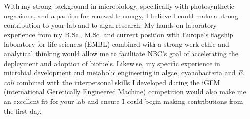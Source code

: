 \documentclass[11pt,a4paper,sans]{moderncv}
\begin{document}
\begin{spacing}{1.15}
With my strong background in microbiology, specifically with photosynthetic organisms, and a passion for renewable energy, I believe I could make a strong contribution to your lab and to algal research. 
My hands-on laboratory experience from my B.Sc., M.Sc. and current position with Europe's flagship laboratory for life sciences (EMBL) combined with a strong work ethic and analytical thinking would allow me to facilitate NBC's goal of accelerating the deployment and adoption of biofuels.
Likewise, my specific experience in microbial development and metabolic engineering in algae, cyanobacteria and \textit{E. coli} combined with the interpersonal skills I developed during the iGEM (international Genetically Engineered Machine) competition would also make me an excellent fit for your lab and ensure I could begin making contributions from the first day. 
\par\vspace*{1mm}


\end{spacing}
\end{document}
